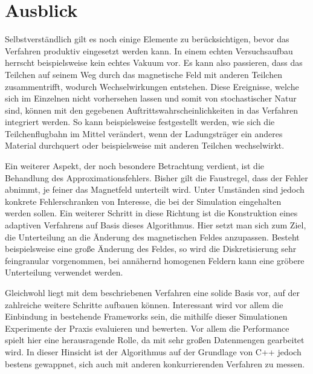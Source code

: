 \chapter{Ausblick}

Selbstverst\"andlich gilt es noch einige Elemente zu ber\"ucksichtigen, bevor das Verfahren produktiv eingesetzt werden kann.
In einem echten Versuchsaufbau herrscht beispielsweise kein echtes Vakuum vor. Es kann also passieren, dass das Teilchen auf seinem
Weg durch das magnetische Feld mit anderen Teilchen zusammentrifft, wodurch Wechselwirkungen entstehen. Diese Ereignisse, welche
sich im Einzelnen nicht vorhersehen lassen und somit von stochastischer Natur sind, k\"onnen mit den gegebenen Auftrittswahrscheinlichkeiten in das Verfahren integriert werden. So kann beispielsweise festgestellt werden, wie sich die Teilchenflugbahn im Mittel ver\"andert,
wenn der Ladungstr\"ager ein anderes Material durchquert oder beispielsweise mit anderen Teilchen wechselwirkt.

Ein weiterer Aspekt, der noch besondere Betrachtung verdient, ist die Behandlung des Approximationsfehlers. Bisher gilt die Faustregel, dass
der Fehler abnimmt, je feiner das Magnetfeld unterteilt wird. Unter Umst\"anden sind jedoch konkrete Fehlerschranken von Interesse, die bei der
Simulation eingehalten werden sollen. Ein weiterer Schritt in diese Richtung ist die Konstruktion eines adaptiven Verfahrens auf Basis dieses Algorithmus.
Hier setzt man sich zum Ziel, die Unterteilung an die \"Anderung des magnetischen Feldes anzupassen. Besteht beispielsweise eine
gro{\ss}e \"Anderung des Feldes, so wird die Diskretisierung sehr feingranular vorgenommen, bei ann\"ahernd homogenen Feldern kann
eine gr\"obere Unterteilung verwendet werden.

Gleichwohl liegt mit dem beschriebenen Verfahren eine solide Basis vor, auf der zahlreiche weitere Schritte aufbauen k\"onnen. Interessant
wird vor allem die Einbindung in bestehende Frameworks sein, die mithilfe dieser Simulationen Experimente der Praxis evaluieren und bewerten.
Vor allem die Performance spielt hier eine herausragende Rolle, da mit sehr gro{\ss}en Datenmengen gearbeitet wird. In dieser Hinsicht ist der
Algorithmus auf der Grundlage von C++ jedoch bestens gewappnet, sich auch  mit anderen konkurrierenden Verfahren zu messen.
